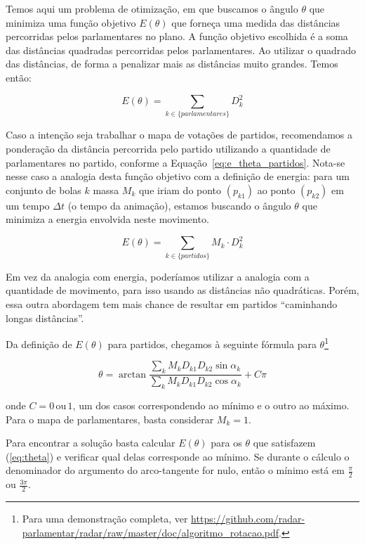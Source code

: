 \documentclass[a4paper, 12pt]{article}
\begin{document}
Temos aqui um problema de otimização, em que buscamos o ângulo $\theta$ que minimiza uma função objetivo $E(\theta)$ que forneça uma medida das distâncias percorridas pelos parlamentares no plano. A função objetivo escolhida é a soma das distâncias quadradas percorridas pelos parlamentares. Ao utilizar o quadrado das distâncias, de forma a penalizar mais as distâncias muito grandes. Temos então:

\begin{equation}
E(\theta)=\sum_{k\in\{parlamentares\}} D_{k}^{2}\label{eq:e_theta}
\end{equation}

Caso a intenção seja trabalhar o mapa de votações de partidos, recomendamos a ponderação da distância percorrida pelo partido utilizando a quantidade de parlamentares no partido, conforme a Equação~\ref{eq:e_theta_partidos}. Nota-se nesse caso a analogia desta função objetivo com a definição de energia: para um conjunto de bolas $k$ massa $M_{k}$ que iriam do ponto $(p_{k1})$ ao ponto $(p_{k2})$ em um tempo $\Delta t$ (o tempo da animação), estamos buscando o ângulo $\theta$ que minimiza a energia envolvida
neste movimento. 

\begin{equation}
E(\theta)=\sum_{k\in\{partidos\}}M_{k}\cdot D_{k}^{2}\label{eq:e_theta_partidos}
\end{equation}

Em vez da analogia com energia, poderíamos utilizar a analogia com a quantidade de movimento, para isso usando as distâncias não quadráticas. Porém, essa outra abordagem tem mais chance de resultar
em partidos ``caminhando longas distâncias''.

Da definição de $E(\theta)$ para partidos, chegamos à seguinte fórmula para $\theta$\footnote{Para uma demonstração completa, ver \url{https://github.com/radar-parlamentar/radar/raw/master/doc/algoritmo_rotacao.pdf}.}

\begin{equation}
\theta=\arctan\frac{\sum_{k}M_{k}D_{k1}D_{k2}\sin\alpha_{k}}{\sum_{k}M_{k}D_{k1}D_{k2}\cos\alpha_{k}}+C\pi
\label{eq:theta}
\end{equation}

onde $C=0\mathrm{\, ou}\,1$, um dos casos correspondendo ao mínimo e o outro ao máximo. Para o mapa de parlamentares, basta considerar $M_{k} = 1$.

Para encontrar a solução basta calcular $E(\theta)$ para os $\theta$ que satisfazem (\ref{eq:theta}) e verificar qual delas corresponde ao mínimo. Se durante o cálculo o denominador do argumento do arco-tangente for nulo, então o mínimo está em $\frac{\pi}{2}$ ou $\frac{3\pi}{2}$.
\end{document}
